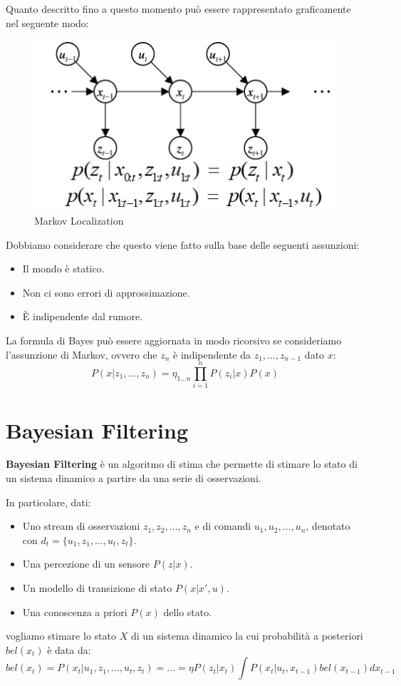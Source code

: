 Quanto descritto fino a questo momento può essere rappresentato graficamente nel
seguente modo:
\begin{figure}[!ht]
    \centering
    \includegraphics[scale=0.5]{./img/ActiveVision/markov_localization.png}
    \caption{Markov Localization}
    \label{fig:markov_localization}
\end{figure}
Dobbiamo considerare che questo viene fatto sulla base delle seguenti assunzioni:
\begin{itemize}
    \item Il mondo è statico.
    \item Non ci sono errori di approssimazione.
    \item È indipendente dal rumore.
\end{itemize}
La formula di Bayes può essere aggiornata in modo ricorsivo se consideriamo l'assunzione
di Markov, ovvero che $z_n$ è indipendente da $z_1, \dots, z_{n-1}$ dato $x$:
\begin{equation}
    P(x | z_1, \dots, z_n) = \eta_{1 \dots n} \prod_{i=1}^{n} P(z_i | x) P(x)
\end{equation}
\section{Bayesian Filtering}
\textbf{Bayesian Filtering} è un algoritmo di stima che permette di stimare lo stato
di un sistema dinamico a partire da una serie di osservazioni.

In particolare, dati:
\begin{itemize}
    \item Uno stream di osservazioni $z_1, z_2, \dots, z_n$ e di comandi $u_1,
              u_2, \dots, u_n$, denotato con $d_t = \{u_1, z_1, \dots, u_t, z_t\}$.
    \item Una percezione di un sensore $P(z|x)$.
    \item Un modello di transizione di stato $P(x|x',u)$.
    \item Una conoscenza a priori $P(x)$ dello stato.
\end{itemize}
vogliamo stimare lo stato $X$ di un sistema dinamico la cui probabilità a posteriori
$bel(x_t)$ è data da:
\begin{equation}
    bel(x_t) = P(x_t | u_1, z_1, \dots, u_t, z_t) = \dots =
    \eta P(z_t|x_t) \int P(x_t|u_t, x_{t - 1})bel(x_{t - 1})dx_{t - 1}
\end{equation}
